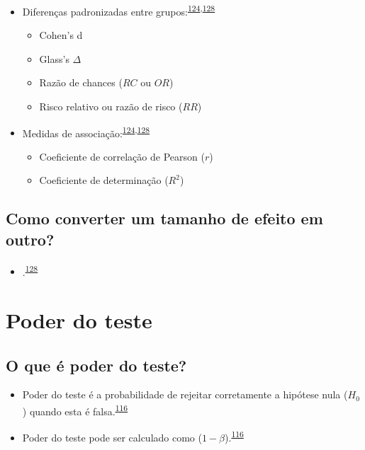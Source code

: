 \documentclass[
  a4paper,
]{book}
\providecommand{\tightlist}{%
  \setlength{\itemsep}{0pt}\setlength{\parskip}{0pt}}
\begin{document}
\begin{itemize}
\item
  Diferenças padronizadas entre grupos:\textsuperscript{\protect\hyperlink{ref-Sullivan2012}{124},\protect\hyperlink{ref-Kim2015}{128}}

  \begin{itemize}
  \item
    Cohen's d
  \item
    Glass's \(\Delta\)
  \item
    Razão de chances (\(RC\) ou \(OR\))
  \item
    Risco relativo ou razão de risco (\(RR\))
  \end{itemize}
\item
  Medidas de associação:\textsuperscript{\protect\hyperlink{ref-Sullivan2012}{124},\protect\hyperlink{ref-Kim2015}{128}}

  \begin{itemize}
  \item
    Coeficiente de correlação de Pearson (\(r\))
  \item
    Coeficiente de determinação (\(R^2\))
  \end{itemize}
\end{itemize}

\hypertarget{como-converter-um-tamanho-de-efeito-em-outro}{%
\subsection{Como converter um tamanho de efeito em outro?}\label{como-converter-um-tamanho-de-efeito-em-outro}}

\begin{itemize}
\tightlist
\item
  .\textsuperscript{\protect\hyperlink{ref-Kim2015}{128}}
\end{itemize}

\hypertarget{poder-teste}{%
\section{Poder do teste}\label{poder-teste}}

\hypertarget{o-que-uxe9-poder-do-teste}{%
\subsection{O que é poder do teste?}\label{o-que-uxe9-poder-do-teste}}

\begin{itemize}
\item
  Poder do teste é a probabilidade de rejeitar corretamente a hipótese nula (\(H_{0}\)) quando esta é falsa.\textsuperscript{\protect\hyperlink{ref-Curran-Everett2009}{116}}
\item
  Poder do teste pode ser calculado como (\(1 - \beta\)).\textsuperscript{\protect\hyperlink{ref-Curran-Everett2009}{116}}
\end{itemize}
\end{document}
